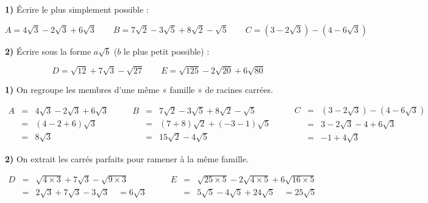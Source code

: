 \begin{methode}
	\textbf{1)} Écrire le plus simplement possible :

	\[
		A = 4\sqrt{3} - 2\sqrt{3} + 6\sqrt{3} \qquad B = 7\sqrt{2} - 3\sqrt{5} + 8\sqrt{2} - \sqrt{5} \qquad C = \left( 3 - 2\sqrt{3} \right) - \left( 4 - 6\sqrt{3} \right)
	\]

	\textbf{2)} Écrire sous la forme $a\sqrt{b}$ ($b$ le plus petit possible) :

	\[
		D = \sqrt{12} + 7\sqrt{3} - \sqrt{27} \qquad E = \sqrt{125} - 2\sqrt{20} + 6\sqrt{80}
	\]

	\begin{correction}

		\textbf{1)} On regroupe les membres d'une même « famille » de racines carrées.

		\[
			\begin{array}{rcl}
				A & = & 4\sqrt{3} - 2\sqrt{3} + 6\sqrt{3} \\
				  & = & (4 - 2 + 6)\sqrt{3}               \\
				  & = & 8\sqrt{3}
			\end{array}\qquad \begin{array}{rcl}
				B & = & 7\sqrt{2} - 3\sqrt{5} + 8\sqrt{2} - \sqrt{5} \\
				  & = & (7 + 8)\sqrt{2} + (-3 - 1)\sqrt{5}           \\
				  & = & 15\sqrt{2} - 4\sqrt{5}
			\end{array}\qquad \begin{array}{rcl}
				C & = & \left( 3 - 2\sqrt{3} \right) - \left( 4 - 6\sqrt{3} \right) \\
				  & = & 3 - 2\sqrt{3} - 4 + 6\sqrt{3}                               \\
				  & = & -1 + 4\sqrt{3}
			\end{array}
		\]

		\textbf{2)} On extrait les carrés parfaits pour ramener à la même famille.

		\[
			\begin{array}{rcl}
				D & = & \sqrt{4 \times 3} + 7\sqrt{3} - \sqrt{9 \times 3}   \\
				  & = & 2\sqrt{3} + 7\sqrt{3} - 3\sqrt{3} \quad = 6\sqrt{3}
			\end{array}\qquad \begin{array}{rcl}
				E & = & \sqrt{25 \times 5} - 2\sqrt{4 \times 5} + 6\sqrt{16 \times 5} \\
				  & = & 5\sqrt{5} - 4\sqrt{5} + 24\sqrt{5} \quad = 25\sqrt{5}
			\end{array}
		\]

	\end{correction}
\end{methode}

